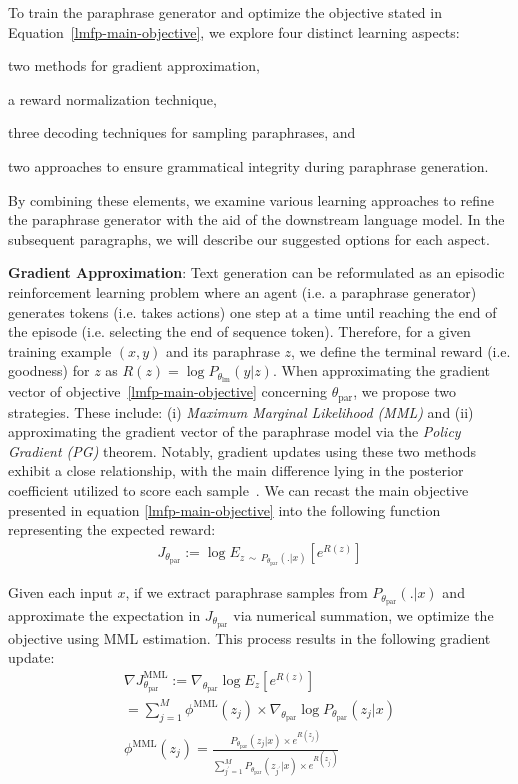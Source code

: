 \documentclass[11pt]{article}
\begin{document}
To train the paraphrase generator and optimize the objective stated in Equation~\ref{lmfp-main-objective}, we explore four distinct learning aspects: 
\begin{inparaenum}[(a)]
\item two methods for gradient approximation, 
\item a reward normalization technique, 
\item three decoding techniques for sampling paraphrases, and 
\item two approaches to ensure grammatical integrity during paraphrase generation. 
\end{inparaenum} 
By combining these elements, we examine various learning approaches to refine the paraphrase generator with the aid of the downstream language model. In the subsequent paragraphs, we will describe our suggested options for each aspect.

\textbf{Gradient Approximation}:
\noindent
Text generation can be reformulated as an episodic reinforcement learning problem where an agent (i.e. a paraphrase generator) generates tokens (i.e. takes actions) one step at a time until reaching the end of the episode (i.e. selecting the end of sequence token). Therefore, for a given training example $(x, y)$ and its paraphrase $z$, we define the terminal reward (i.e. goodness) for $z$ as $R(z) = \log P_{\theta_{\text{lm}}} (y | z)$. When approximating the gradient vector of objective~\ref{lmfp-main-objective} concerning $\theta_{\text{par}}$, we propose two strategies. These include: (i) \emph{Maximum Marginal Likelihood (MML)} and (ii) approximating the gradient vector of the paraphrase model via the \emph{Policy Gradient (PG)} theorem. Notably, gradient updates using these two methods exhibit a close relationship, with the main difference lying in the posterior coefficient utilized to score each sample~\cite{guu-etal-2017-language}. We can recast the main objective presented in equation \ref{lmfp-main-objective} into the following function representing the expected reward:
\begin{multline}
J_{\theta_{\text{par}}} := \log E_{z \, \sim \, P_{\theta_{\text{par}}}(.|x)} [e^{R(z)}]
\label{lmfp-expect-objective}
\end{multline}

Given each input $x$, if we extract paraphrase samples from $P_{\theta_{\text{par}}}(.|x)$ and approximate the expectation in $J_{\theta_{\text{par}}}$ via numerical summation, we optimize the objective using MML estimation. This process results in the following gradient update:
\begin{multline}
\nabla J^{\text{MML}}_{\theta_{\text{par}}} := \nabla_{\theta_{\text{par}}} \log E_{z} [e^{R(z)}] \\ = 
\sum^{M}_{j=1} \phi^{\text{MML}}(z_{j}) \times \nabla_{\theta_{\text{par}}} \log P_{\theta_{\text{par}}}(z_{j}|x) \\
\phi^{\text{MML}}(z_{j}) = \frac{P_{\theta_{\text{par}}}(z_{j}|x) \times e^{R(z_{j})}}{\sum^{M}_{j^{'}=1} P_{\theta_{\text{par}}}(z_{j^{'}}|x) \times e^{R(z_{j^{'}})}}
\label{mml-objective}
\end{multline}
\end{document}
